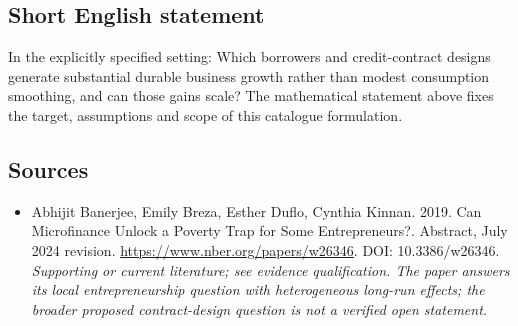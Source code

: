 \documentclass[11pt]{article}
\begin{document}
\subsection{Short English statement}
In the explicitly specified setting: Which borrowers and credit-contract designs generate substantial durable business growth rather than modest consumption smoothing, and can those gains scale? The mathematical statement above fixes the target, assumptions and scope of this catalogue formulation.

\subsection{Sources}
\begin{itemize}\raggedright
\item[\textnormal{[S1]}]\hypertarget{source:30007655:1}{} Abhijit Banerjee, Emily Breza, Esther Duflo, Cynthia Kinnan. 2019. Can Microfinance Unlock a Poverty Trap for Some Entrepreneurs?. Abstract, July 2024 revision.
\url{https://www.nber.org/papers/w26346}.
DOI: 10.3386/w26346.
{\small\textit{Supporting or current literature; see evidence qualification. The paper answers its local entrepreneurship question with heterogeneous long-run effects; the broader proposed contract-design question is not a verified open statement.}}
\end{itemize}
\end{document}

